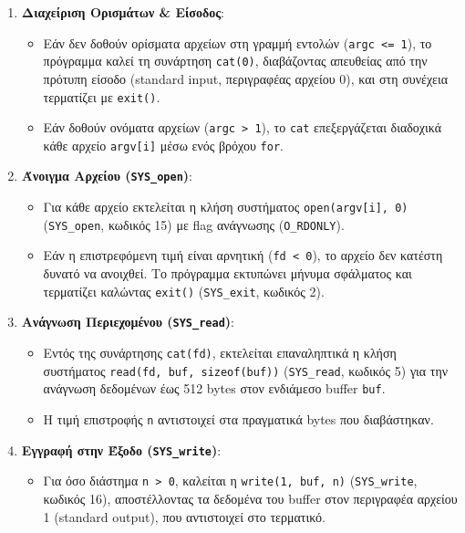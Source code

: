 \documentclass[11pt,a4paper]{article}
\begin{document}
\begin{enumerate}
    \item \textbf{Διαχείριση Ορισμάτων \& Είσοδος}:
    \begin{itemize}
        \item Εάν δεν δοθούν ορίσματα αρχείων στη γραμμή εντολών (\texttt{argc <= 1}), το πρόγραμμα καλεί τη συνάρτηση \texttt{cat(0)}, 
        διαβάζοντας απευθείας από την πρότυπη είσοδο (standard input, περιγραφέας αρχείου 0), και στη συνέχεια τερματίζει με 
        \texttt{exit()}.
        \item Εάν δοθούν ονόματα αρχείων (\texttt{argc > 1}), το \texttt{cat} επεξεργάζεται διαδοχικά κάθε αρχείο \texttt{argv[i]} 
        μέσω ενός βρόχου \texttt{for}.
    \end{itemize}

    \item \textbf{Άνοιγμα Αρχείου (\texttt{SYS\_open})}:
    \begin{itemize}
        \item Για κάθε αρχείο εκτελείται η κλήση συστήματος \texttt{open(argv[i], 0)} (\texttt{SYS\_open}, κωδικός 15) με flag ανάγνωσης 
        (\texttt{O\_RDONLY}).
        \item Εάν η επιστρεφόμενη τιμή είναι αρνητική (\texttt{fd < 0}), το αρχείο δεν κατέστη δυνατό να ανοιχθεί. 
        Το πρόγραμμα εκτυπώνει μήνυμα σφάλματος και τερματίζει καλώντας \texttt{exit()} (\texttt{SYS\_exit}, κωδικός 2).
    \end{itemize}

    \item \textbf{Ανάγνωση Περιεχομένου (\texttt{SYS\_read})}:
    \begin{itemize}
        \item Εντός της συνάρτησης \texttt{cat(fd)}, εκτελείται επαναληπτικά η κλήση συστήματος \texttt{read(fd, buf, sizeof(buf))} 
        (\texttt{SYS\_read}, κωδικός 5) για την ανάγνωση δεδομένων έως 512 bytes στον ενδιάμεσο buffer \texttt{buf}.
        \item Η τιμή επιστροφής \texttt{n} αντιστοιχεί στα πραγματικά bytes που διαβάστηκαν.
    \end{itemize}

    \item \textbf{Εγγραφή στην Έξοδο (\texttt{SYS\_write})}:
    \begin{itemize}
        \item Για όσο διάστημα \texttt{n > 0}, καλείται η \texttt{write(1, buf, n)} (\texttt{SYS\_write}, κωδικός 16), 
        αποστέλλοντας τα δεδομένα του buffer στον περιγραφέα αρχείου 1 (standard output), που αντιστοιχεί στο τερματικό.
    \end{itemize}


\end{enumerate}
\end{document}
